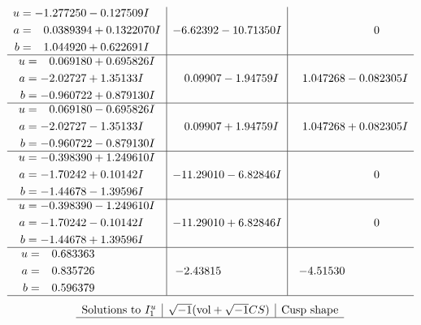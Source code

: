 \documentclass[1p]{elsarticle_modified}
\theoremstyle{definition}
\newcommand{\I}{\sqrt{-1}}
\begin{document}
$$\begin{array}{c|c|c}
\begin{aligned}
u &= -1.277250 - 0.127509 I \\
a &= \phantom{-}0.0389394 + 0.1322070 I \\
b &= \phantom{-}1.044920 + 0.622691 I\end{aligned}
 & -6.62392 - 10.71350 I & \phantom{-0.000000 } 0 \\ \hline\begin{aligned}
u &= \phantom{-}0.069180 + 0.695826 I \\
a &= -2.02727 + 1.35133 I \\
b &= -0.960722 + 0.879130 I\end{aligned}
 & \phantom{-}0.09907 - 1.94759 I & \phantom{-}1.047268 - 0.082305 I \\ \hline\begin{aligned}
u &= \phantom{-}0.069180 - 0.695826 I \\
a &= -2.02727 - 1.35133 I \\
b &= -0.960722 - 0.879130 I\end{aligned}
 & \phantom{-}0.09907 + 1.94759 I & \phantom{-}1.047268 + 0.082305 I \\ \hline\begin{aligned}
u &= -0.398390 + 1.249610 I \\
a &= -1.70242 + 0.10142 I \\
b &= -1.44678 - 1.39596 I\end{aligned}
 & -11.29010 - 6.82846 I & \phantom{-0.000000 } 0 \\ \hline\begin{aligned}
u &= -0.398390 - 1.249610 I \\
a &= -1.70242 - 0.10142 I \\
b &= -1.44678 + 1.39596 I\end{aligned}
 & -11.29010 + 6.82846 I & \phantom{-0.000000 } 0 \\ \hline\begin{aligned}
u &= \phantom{-}0.683363\phantom{ +0.000000I} \\
a &= \phantom{-}0.835726\phantom{ +0.000000I} \\
b &= \phantom{-}0.596379\phantom{ +0.000000I}\end{aligned}
 & -2.43815\phantom{ +0.000000I} & -4.51530\phantom{ +0.000000I}\\
 \hline 
 \end{array}$$\newpage$$\begin{array}{c|c|c}  
\text{Solutions to }I^u_{1}& \I (\text{vol} + \sqrt{-1}CS) & \text{Cusp shape}\\
 \hline 

\end{array}$$
\end{document}
